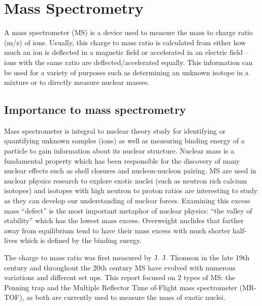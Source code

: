 \section{Mass Spectrometry}
A mass spectrometer (MS) is a device used to measure the mass to charge ratio (m/z) of ions.
Usually, this charge to mass ratio is calculated from either how much an ion is deflected in a magnetic field or accelerated in an electric field – ions with the same ratio are deflected/accelerated equally.
This information can be used for a variety of purposes such as determining an unknown isotope in a mixture or to directly measure nuclear masses.

\subsection{Importance to mass spectrometry}
Mass spectrometer is integral to nuclear theory study for identifying or quantifying unknown samples (ions) as well as measuring binding energy of a particle to gain information about its nuclear structure.
Nuclear mass is a fundamental property which has been responsible for the discovery of many nuclear effects such as shell closures and nucleon-nucleon pairing. \cite{blaum_precision_2012}
MS are used in nuclear physics research to explore exotic nuclei (such as neutron rich calcium isotopes) and isotopes with high neutron to proton ratios are interesting to study as they can develop our understanding of nuclear forces.
Examining this excess mass “defect” is the most important metaphor of nuclear physics: “the valley of stability” which has the lowest mass excess.
Overweight nuclides that farther away from equilibrium tend to have their mass excess with much shorter half-lives which is defined by the binding energy.

The charge to mass ratio was first measured by J. J. Thomson in the late 19th century \cite{noauthor_j_nodate} and throughout the 20th century MS have evolved with numerous variations and different set ups.
This report focused on 2 types of MS: the Penning trap and the Multiple Reflector Time of-Flight mass spectrometer (MR-TOF), as both are currently used to measure the mass of exotic nuclei. \cite{famiano_nuclear_2019}


